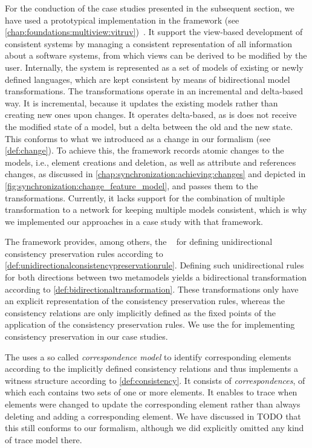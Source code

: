 For the conduction of the case studies presented in the subsequent section, we have used a prototypical implementation in the \vitruv framework (see \autoref{chap:foundations:multiview:vitruv})~\cite{klare2020Vitruv-JSS}.
It support the view-based development of consistent systems by managing a consistent representation of all information about a software systems, from which views can be derived to be modified by the user.
Internally, the system is represented as a set of models of existing or newly defined languages, which are kept consistent by means of bidirectional model transformations.
The transformations operate in an incremental and delta-based way. 
It is incremental, because it updates the existing models rather than creating new ones upon changes.
It operates delta-based, as is does not receive the modified state of a model, but a delta between the old and the new state.
This conforms to what we introduced as a change in our formalism (see \autoref{def:change}).
To achieve this, the framework records atomic changes to the models, i.e., element creations and deletion, as well as attribute and references changes, as discussed in \autoref{chap:synchronization:achieving:changes} and depicted in \autoref{fig:synchronization:change_feature_model}, and passes them to the transformations.
Currently, it lacks support for the combination of multiple transformation to a network for keeping multiple models consistent, which is why we implemented our approaches in a case study with that framework.

The \vitruv framework provides, among others, the \reactionslanguage~\cite{klare2016b,langhammer2017a} for defining unidirectional consistency preservation rules according to \autoref{def:unidirectionalconsistencypreservationrule}.
Defining such unidirectional rules for both directions between two metamodels yields a bidirectional transformation according to \autoref{def:bidirectionaltransformation}.
These transformations only have an explicit representation of the consistency preservation rules, whereas the consistency relations are only implicitly defined as the fixed points of the application of the consistency preservation rules.
We use the \reactionslanguage for implementing consistency preservation in our case studies.

The \reactionslanguage uses a so called \emph{correspondence model} to identify corresponding elements according to the implicitly defined consistency relations and thus implements a witness structure according to \autoref{def:consistency}.
It consists of \emph{correspondences}, of which each contains two sets of one or more elements.
It enables to trace when elements were changed to update the corresponding element rather than always deleting and adding a corresponding element.
We have discussed in TODO that this still conforms to our formalism, although we did explicitly omitted any kind of trace model there.

